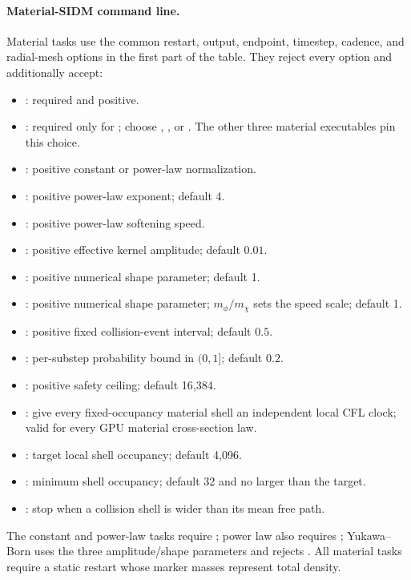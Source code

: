 \paragraph{Material-SIDM command line.}
Material tasks use the common restart, output, endpoint, timestep, cadence, and
radial-mesh options in the first part of the table.  They reject every
 option and additionally accept:
\begin{itemize}[leftmargin=1.5em]
\item {}: required and positive.
\item {}: required only for
; choose ,
, or .  The other three material executables
pin this choice.
\item {}: positive constant or power-law normalization.
\item {}: positive power-law exponent; default 4.
\item {}: positive power-law softening speed.
\item {}: positive effective kernel amplitude;
      default \(0.01\).
\item {}: positive numerical shape parameter;
      default 1.
\item {}: positive numerical shape parameter;
      \(m_\phi/m_\chi\) sets the speed scale; default 1.
\item {}: positive fixed collision-event
interval; default \(0.5\).
\item {}: per-substep probability bound in
\((0,1]\); default \(0.2\).
\item {}: positive safety ceiling;
default 16,384.
\item {}: give every fixed-occupancy
material shell an independent local CFL clock; valid for every GPU material
cross-section law.
\item {}: target local shell occupancy;
default 4,096.
\item {}: minimum shell occupancy; default
32 and no larger than the target.
\item {}: stop when a collision shell is
wider than its mean free path.
\end{itemize}
The constant and power-law tasks require ; power law also
requires ; Yukawa--Born uses the three amplitude/shape
parameters and rejects .  All material tasks require a
static restart whose marker masses represent total density.

